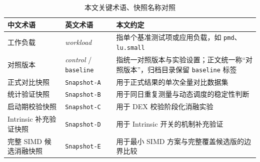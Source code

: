 \begin{table}[htbp]
    \centering
    \small
    \caption{本文关键术语、快照名称对照}
    \label{tab:experiment-terms}
    \begin{tabular}{>{\raggedright\arraybackslash}p{2.7cm}>{\raggedright\arraybackslash}p{3.6cm}>{\raggedright\arraybackslash}p{5.0cm}}
        \hline
        \textbf{中文术语} & \textbf{英文术语} & \textbf{本文约定} \\
        \hline
        工作负载 & \textit{workload} & 指单个基准测试项或应用负载，如 \texttt{pmd}、\texttt{lu.small} \\
        对照版本 & \textit{control} / \texttt{baseline} & 指统一对照版本与实验设置；正文统一称“对照版本”，归档目录保留 \texttt{baseline} 标签 \\
        正式对比快照 & \texttt{Snapshot-A}  & 用于正式结果的单次全量对比数据集 \\
        统计验证快照 & \texttt{Snapshot-B}  & 用于同日重复测量与动态调度的稳定性判断 \\
        启动期校验快照 & \texttt{Snapshot-C}  & 用于 DEX 校验阶段化消融实验 \\
        Intrinsic 补充验证快照 & \texttt{Snapshot-D}  & 用于 Intrinsic 开关的机制补充验证 \\
        完整 SIMD 候选消融快照 & \texttt{Snapshot-E} & 用于最小 SIMD 方案与完整覆盖候选版的边界比较 \\
        \hline
    \end{tabular}
\end{table}

